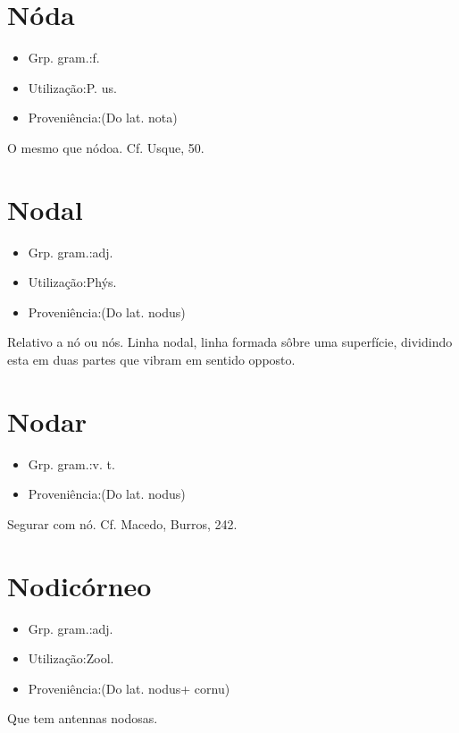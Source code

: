 \section{Nóda}
\begin{itemize}
\item {Grp. gram.:f.}
\end{itemize}
\begin{itemize}
\item {Utilização:P. us.}
\end{itemize}
\begin{itemize}
\item {Proveniência:(Do lat. \textunderscore nota\textunderscore )}
\end{itemize}
O mesmo que \textunderscore nódoa\textunderscore . Cf. Usque, 50.
\section{Nodal}
\begin{itemize}
\item {Grp. gram.:adj.}
\end{itemize}
\begin{itemize}
\item {Utilização:Phýs.}
\end{itemize}
\begin{itemize}
\item {Proveniência:(Do lat. \textunderscore nodus\textunderscore )}
\end{itemize}
Relativo a nó ou nós.
\textunderscore Linha nodal\textunderscore , linha formada sôbre uma superfície, dividindo esta em duas partes que vibram em sentido opposto.
\section{Nodar}
\begin{itemize}
\item {Grp. gram.:v. t.}
\end{itemize}
\begin{itemize}
\item {Proveniência:(Do lat. \textunderscore nodus\textunderscore )}
\end{itemize}
Segurar com nó. Cf. Macedo, \textunderscore Burros\textunderscore , 242.
\section{Nodicórneo}
\begin{itemize}
\item {Grp. gram.:adj.}
\end{itemize}
\begin{itemize}
\item {Utilização:Zool.}
\end{itemize}
\begin{itemize}
\item {Proveniência:(Do lat. \textunderscore nodus\textunderscore  + \textunderscore cornu\textunderscore )}
\end{itemize}
Que tem antennas nodosas.
